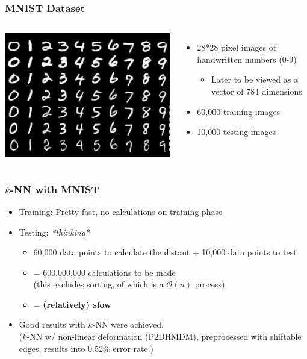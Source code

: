 \documentclass[aspectratio=169]{beamer}
\begin{document}
\begin{frame}
	\frametitle{MNIST Dataset}
	\begin{columns}
		\includegraphics[width=1.0\textwidth]{imgs/mnist.jpeg}
		\begin{itemize}
			\item<2-> 28*28 pixel images of handwritten numbers (0-9)
			\begin{itemize}
				\item<3-> Later to be viewed as a vector of 784 dimensions
			\end{itemize}
			\item<4-> 60,000 training images
			\item<5-> 10,000 testing images
		\end{itemize}
	\end{columns}
\end{frame}

\begin{frame}
	\frametitle{$k$-NN with MNIST}
	\begin{itemize}
		\item<2-> Training: Pretty fast, no calculations on training phase
		\item<3-> Testing: \textit{*thinking*}
			\begin{itemize}
				\item<4-> 60,000 data points to calculate the distant + 10,000 data points to test
				\item<5-> = 600,000,000 calculations to be made\\
					(this excludes sorting, of which is a $\mathcal{O}(n)$ process)
				\item<6-> = \textbf{(relatively) slow}
			\end{itemize}
		\item<7-> Good results with $k$-NN were achieved.\\
		($k$-NN w/ non-linear deformation (P2DHMDM), preprocessed with shiftable edges, results into 0.52\% error rate.)
	\end{itemize}
\end{frame}
\end{document}
